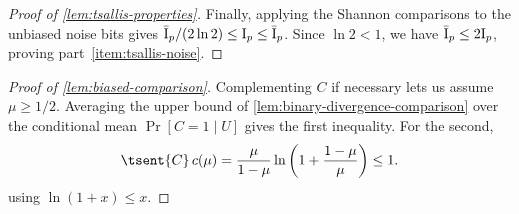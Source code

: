 \begin{proof}[Proof of \autoref{lem:tsallis-properties}]
Finally, applying the Shannon comparisons to the unbiased noise
bits gives $\bar{\mathrm{I}}_p/(2\ln2)\le\mathrm{I}_p\le\bar{\mathrm{I}}_p$. Since $\ln2<1$,
we have $\bar{\mathrm{I}}_p\le2\mathrm{I}_p$, proving part~\ref{item:tsallis-noise}.
\end{proof}

\begin{proof}[Proof of \autoref{lem:biased-comparison}]
Complementing $C$ if necessary lets us assume $\mu\ge1/2$.
Averaging the upper bound of
\autoref{lem:binary-divergence-comparison} over the conditional
mean $\Pr[C=1\mid U]$ gives the first inequality.
For the second,
\begin{equation*}
  \tsent{C}\,c(\mu)
  =\frac{\mu}{1-\mu}\ln\left(1+\frac{1-\mu}{\mu}\right)
  \le1.
\end{equation*}
using $\ln(1+x)\le x$.
\end{proof}
